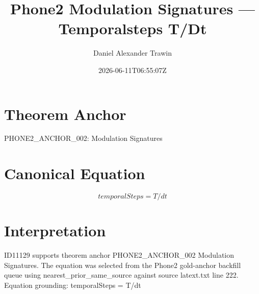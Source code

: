 \documentclass[11pt]{article}
\title{Phone2 Modulation Signatures — Temporalsteps T/Dt}
\author{Daniel Alexander Trawin}
\date{2026-06-11T06:55:07Z}
\begin{document}
\maketitle
\section*{Theorem Anchor}
PHONE2_ANCHOR_002: Modulation Signatures
\section*{Canonical Equation}
\[
temporalSteps = T/dt
\]
\section*{Interpretation}
ID11129 supports theorem anchor PHONE2_ANCHOR_002 Modulation Signatures. The equation was selected from the Phone2 gold-anchor backfill queue using nearest_prior_same_source against source latext.txt line 222. Equation grounding: temporalSteps = T/dt
\end{document}
